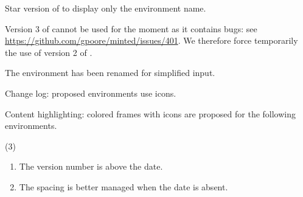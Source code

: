 \tdocsep




\begin{tdocnew}[version = 1.3.1, date = 2024-09-26]
    \item Star version of  to display only the environment name.
\end{tdocnew}

\tdocsep




\begin{tdoctech}[version = 1.3.0, date = 2024-09-25]
    \item Version 3 of  cannot be used for the moment as it contains bugs: see \url{https://github.com/gpoore/minted/issues/401}. We therefore force temporarily the use of version 2 of .
\end{tdoctech}


\begin{tdocbreak}
    \item The  environment has been renamed  for simplified input.
\end{tdocbreak}


\begin{tdocnew}
    \item Change log: proposed environments use icons.


    \item Content highlighting: colored frames with icons are proposed for the following environments.
    \begin{tasks}[label=\arabic*.](3)
        \task {}
        \task {}
        \task {}
        \task {}
        \task {}
    \end{tasks}
\end{tdocnew}

\tdocsep




\begin{tdocupdate}[version = 1.2.0-a, date = 2024-08-23]
    \item {}
    \begin{enumerate}
        \item The version number is above the date.

        \item The spacing is better managed when the date is absent.
    \end{enumerate}
\end{tdocupdate}


